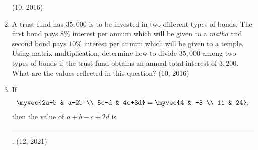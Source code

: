 \begin{enumerate}[label=\thesubsection.\arabic*, ref=\thesubsection.\theenumi]
\hfill (10, 2016)
\item A trust fund has \rupee $35,000$ is to be invested in two different types of bonds. The first bond pays $8\%$ interest per annum which will be given to a {\em matha} and second bond pays $10\%$ interest per annum which will be given to a temple. Using matrix multiplication, determine how to divide \rupee $35,000$ among two types of bonds if the trust fund obtains an annual total interest of \rupee $3,200$. What are the values reflected in this question? 
\hfill (10, 2016)
    \item If
\begin{align*}
\myvec{2a+b & a-2b \\ 5c-d & 4c+3d} = \myvec{4 & -3 \\ 11 & 24},
\end{align*}
then the value of $a + b - c + 2d$ is
\rule{1cm}{0.1pt}.
\hfill (12, 2021)


\end{enumerate}
